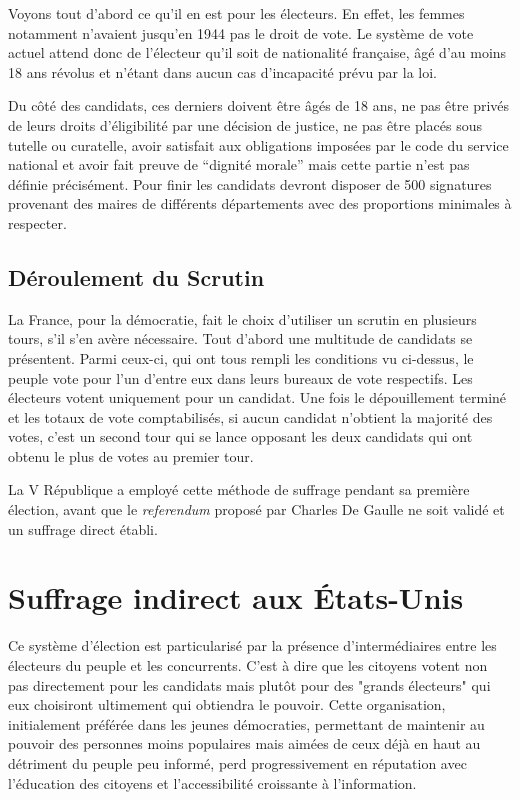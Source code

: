 \documentclass[11pt,a4paper]{report}
\begin{document}
Voyons tout d'abord ce qu'il en est pour les électeurs.
En effet, les femmes notamment n’avaient jusqu'en 1944 \nocite{wiki:droitvotefemmes} pas le droit de vote.
Le système de vote actuel attend donc de l'électeur qu’il soit de nationalité française, âgé d'au moins 18 ans révolus et n’étant dans aucun cas d’incapacité prévu par la loi.

Du côté des candidats, ces derniers doivent être âgés de 18 ans, ne pas être privés de leurs droits d’éligibilité par une décision de justice, ne pas être placés sous tutelle ou curatelle, avoir satisfait aux obligations imposées par le code du service national et avoir fait preuve de “dignité morale” mais cette partie n’est pas définie précisément.
Pour finir les candidats devront disposer de 500 signatures provenant des maires de différents départements avec des proportions minimales à respecter.

\subsection{Déroulement du Scrutin}

La France, pour la démocratie, fait le choix d'utiliser un scrutin en plusieurs tours, s'il s'en avère nécessaire.
Tout d’abord une multitude de candidats se présentent.
Parmi ceux-ci, qui ont tous rempli les conditions vu ci-dessus, le peuple vote pour l’un d’entre eux dans leurs bureaux de vote respectifs.
Les électeurs votent uniquement pour un candidat.
Une fois le dépouillement terminé et les totaux de vote comptabilisés, si aucun candidat n’obtient la majorité des votes, c’est un second tour qui se lance opposant les deux candidats qui ont obtenu le plus de votes au premier tour.

La V République a employé cette méthode de suffrage pendant sa première élection, avant que le \textit{referendum} proposé par Charles De Gaulle ne soit validé et un suffrage direct établi. \nocite{polmania:scrutins}

\section{Suffrage indirect aux États-Unis}

Ce système d'élection est particularisé par la présence d'intermédiaires entre les électeurs du peuple et les concurrents. 
C'est à dire que les citoyens votent non pas directement pour les candidats mais plutôt pour des "grands électeurs" qui eux choisiront ultimement qui obtiendra le pouvoir.
Cette organisation, initialement préférée dans les jeunes démocraties, permettant de maintenir au pouvoir des personnes moins populaires mais aimées de ceux déjà en haut au détriment du peuple peu informé, perd progressivement en réputation avec l'éducation des citoyens et l'accessibilité croissante à l'information.
\nocite{wiki:scrutinindir}
\end{document}
